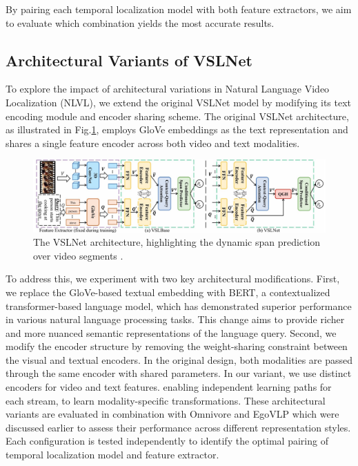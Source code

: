 \documentclass[10pt,twocolumn,letterpaper]{article}
\begin{document}
By pairing each temporal localization model with both feature extractors, we aim to evaluate which combination yields the most accurate results. 

	
	
\subsection{Architectural Variants of VSLNet}
	
To explore the impact of architectural variations in Natural Language Video Localization (NLVL), we extend the original VSLNet model by modifying its text encoding module and encoder sharing scheme. The original VSLNet architecture, as illustrated in Fig.\ref{fig:VSLNet_VSLBase}, employs GloVe embeddings as the text representation and shares a single feature encoder across both video and text modalities.


\begin{figure}[h] %
		\centering
		\includegraphics[width=\columnwidth]{VSLNet_VSLBase.jpg} %
		\caption{The VSLNet architecture, highlighting the dynamic span prediction over video segments \cite{4_Span_based_Localizing_Network_for_Natural_Language_Video_Localization}.}
		\label{fig:VSLNet_VSLBase}
	\end{figure}

	
To address this, we experiment with two key architectural modifications. First, we replace the GloVe-based textual embedding with BERT, a contextualized transformer-based language model, which has demonstrated superior performance in various natural language processing tasks. This change aims to provide richer and more nuanced semantic representations of the language query. Second, we modify the encoder structure by removing the weight-sharing constraint between the visual and textual encoders. In the original design, both modalities are passed through the same encoder with shared parameters. In our variant, we use distinct encoders for video and text features. enabling independent learning paths for each stream, to learn modality-specific transformations. These architectural variants are evaluated in combination with Omnivore and EgoVLP which were discussed earlier to assess their performance across different representation styles. Each configuration is tested independently to identify the optimal pairing of temporal localization model and feature extractor. 
		
\end{document}
